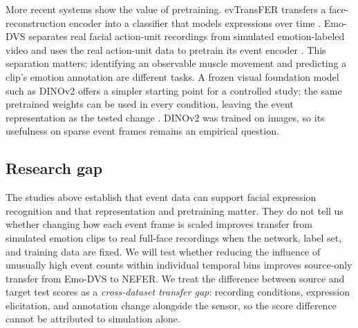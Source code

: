 More recent systems show the value of pretraining. evTransFER transfers a face-reconstruction encoder into a classifier that models expressions over time \cite{verschae2026}. Emo-DVS separates real facial action-unit recordings from simulated emotion-labeled video and uses the real action-unit data to pretrain its event encoder \cite{chen2026}. This separation matters: identifying an observable muscle movement and predicting a clip's emotion annotation are different tasks. A frozen visual foundation model such as DINOv2 offers a simpler starting point for a controlled study: the same pretrained weights can be used in every condition, leaving the event representation as the tested change \cite{oquab2024}. DINOv2 was trained on images, so its usefulness on sparse event frames remains an empirical question.

\subsection{Research gap}
The studies above establish that event data can support facial expression recognition and that representation and pretraining matter. They do not tell us whether changing how each event frame is scaled improves transfer from simulated emotion clips to real full-face recordings when the network, label set, and training data are fixed. We will test whether reducing the influence of unusually high event counts within individual temporal bins improves source-only transfer from Emo-DVS to NEFER. We treat the difference between source and target test scores as a \emph{cross-dataset transfer gap}: recording conditions, expression elicitation, and annotation change alongside the sensor, so the score difference cannot be attributed to simulation alone.
